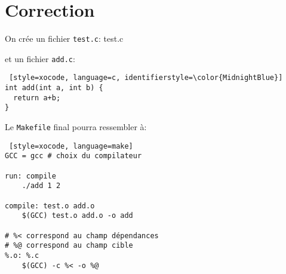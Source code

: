 \documentclass[10pt, a4paper ]{article}
\begin{document}
\newpage
\section{Correction}

On crée un fichier \texttt{test.c}:
 {test.c}

et un fichier \texttt{add.c}:
\begin{lstlisting} [style=xocode, language=c, identifierstyle=\color{MidnightBlue}]
int add(int a, int b) {
  return a+b;
}
\end{lstlisting}

Le \texttt{Makefile} final pourra ressembler à:



\begin{lstlisting} [style=xocode, language=make]
GCC = gcc # choix du compilateur

run: compile
    ./add 1 2

compile: test.o add.o
    $(GCC) test.o add.o -o add

# %< correspond au champ dépendances
# %@ correspond au champ cible
%.o: %.c
    $(GCC) -c %< -o %@
\end{lstlisting}
\end{document}
